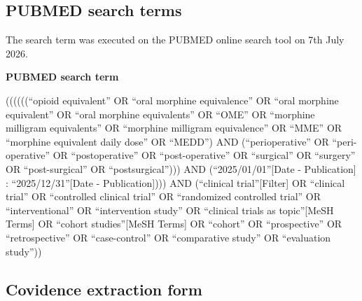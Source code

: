 \documentclass[
  letterpaper,
  DIV=11,
  numbers=noendperiod]{scrreprt}
\begin{document}
{\begin{tcolorbox}[enhanced jigsaw, rightrule=.15mm, toprule=.15mm, opacityback=0, breakable, bottomrule=.15mm, colback=white, leftrule=.75mm, arc=.35mm, left=2mm, colframe=quarto-callout-note-color-frame]
\begin{minipage}[t]{\textwidth - 5.5mm}
\end{minipage}%
\end{tcolorbox}

\subsection{PUBMED search terms}\label{sec-appendix-pubmed}

The search term was executed on the PUBMED online search tool on 7th
July 2026.

\begin{tcolorbox}[enhanced jigsaw, rightrule=.15mm, toprule=.15mm, opacityback=0, breakable, bottomrule=.15mm, colback=white, leftrule=.75mm, arc=.35mm, left=2mm, colframe=quarto-callout-note-color-frame]
\begin{minipage}[t]{5.5mm}
\textcolor{quarto-callout-note-color}{\faInfo}
\end{minipage}%
\begin{minipage}[t]{\textwidth - 5.5mm}

\vspace{-3mm}\textbf{PUBMED search term}\vspace{3mm}

((((((``opioid equivalent'' OR ``oral morphine equivalence'' OR ``oral
morphine equivalent'' OR ``oral morphine equivalents'' OR ``OME'' OR
``morphine milligram equivalents'' OR ``morphine milligram equivalence''
OR ``MME'' OR ``morphine equivalent daily dose'' OR ``MEDD'') AND
(``perioperative'' OR ``peri-operative'' OR ``postoperative'' OR
``post-operative'' OR ``surgical'' OR ``surgery'' OR ``post-surgical''
OR ``postsurgical''))) AND (``2025/01/01''{[}Date - Publication{]} :
``2025/12/31''{[}Date - Publication{]}))) AND (``clinical
trial''{[}Filter{]} OR ``clinical trial'' OR ``controlled clinical
trial'' OR ``randomized controlled trial'' OR ``interventional'' OR
``intervention study'' OR ``clinical trials as topic''{[}MeSH Terms{]}
OR ``cohort studies''{[}MeSH Terms{]} OR ``cohort'' OR ``prospective''
OR ``retrospective'' OR ``case-control'' OR ``comparative study'' OR
``evaluation study''))

\end{minipage}%
\end{tcolorbox}

\subsection{Covidence extraction
form}\label{sec-appendix-cov-extraction}

}
\end{document}
